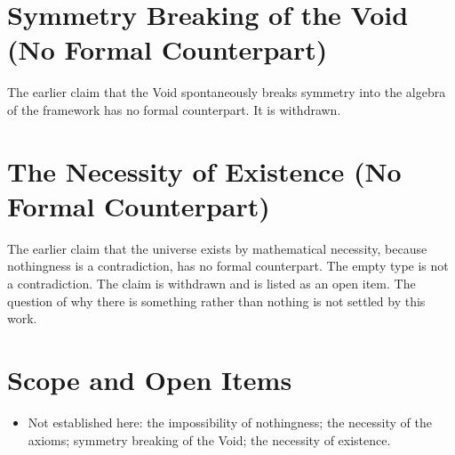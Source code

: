 \documentclass[11pt, a4paper]{article}
\begin{document}
\section{Symmetry Breaking of the Void (No Formal Counterpart)}
The earlier claim that the Void spontaneously breaks symmetry into the algebra of the framework has no formal counterpart. It is withdrawn.

\section{The Necessity of Existence (No Formal Counterpart)}
The earlier claim that the universe exists by mathematical necessity, because nothingness is a contradiction, has no formal counterpart. The empty type is not a contradiction. The claim is withdrawn and is listed as an open item. The question of why there is something rather than nothing is not settled by this work.

\section{Scope and Open Items}
\begin{itemize}
  \item Not established here: the impossibility of nothingness; the necessity of the axioms; symmetry breaking of the Void; the necessity of existence.
\end{itemize}
\end{document}
